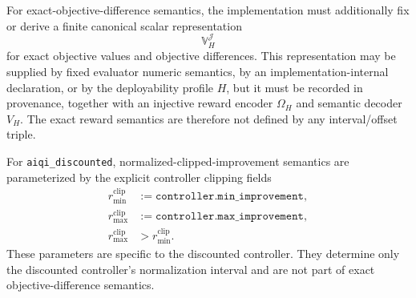\documentclass[11pt]{article}
\begin{document}
For exact-objective-difference semantics, the implementation must additionally
fix or derive a finite canonical scalar representation
\[
\mathbb{V}_H^{\mathcal J}
\]
for exact objective values and objective differences. This representation may
be supplied by fixed evaluator numeric semantics, by an implementation-internal
declaration, or by the deployability profile $H$, but it must be recorded in
provenance, together with an injective reward encoder $\Omega_H$ and semantic
decoder $V_H$. The exact reward semantics are therefore not defined by any
interval/offset triple.

For \texttt{aiqi\_discounted}, normalized-clipped-improvement semantics are
parameterized by the explicit controller clipping fields
\[
\begin{aligned}
r_{\min}^{\mathrm{clip}}&:=\texttt{controller.min\_improvement},\\
r_{\max}^{\mathrm{clip}}&:=\texttt{controller.max\_improvement},\\
r_{\max}^{\mathrm{clip}}&>r_{\min}^{\mathrm{clip}}.
\end{aligned}
\]
These parameters are specific to the discounted controller. They determine only
the discounted controller's normalization interval and are not part of exact
objective-difference semantics.
\end{document}
